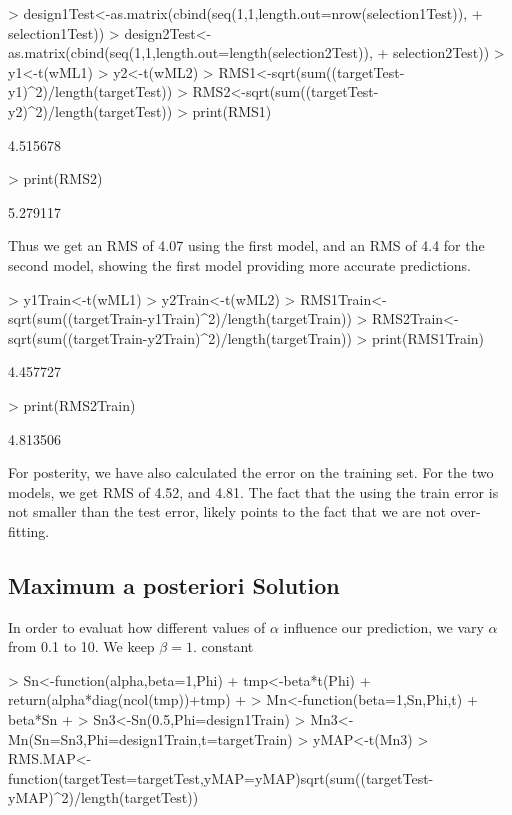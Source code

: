 \documentclass[nogin, 10pt]{article}
\begin{document}
\begin{Schunk}
\begin{Sinput}
> design1Test<-as.matrix(cbind(seq(1,1,length.out=nrow(selection1Test)),
+                          selection1Test))
> design2Test<-as.matrix(cbind(seq(1,1,length.out=length(selection2Test)),
+                          selection2Test))
> y1<-t(wML1)%
> y2<-t(wML2)%
> RMS1<-sqrt(sum((targetTest-y1)^2)/length(targetTest))
> RMS2<-sqrt(sum((targetTest-y2)^2)/length(targetTest))
> print(RMS1)
\end{Sinput}
\begin{Soutput}
[1] 4.515678
\end{Soutput}
\begin{Sinput}
> print(RMS2)
\end{Sinput}
\begin{Soutput}
[1] 5.279117
\end{Soutput}
\end{Schunk}
Thus we get an RMS of 4.07 using the first model, and an RMS of 4.4 for the second model, showing the first model providing more accurate predictions. 

\begin{Schunk}
\begin{Sinput}
> y1Train<-t(wML1)%
> y2Train<-t(wML2)%
> RMS1Train<-sqrt(sum((targetTrain-y1Train)^2)/length(targetTrain))
> RMS2Train<-sqrt(sum((targetTrain-y2Train)^2)/length(targetTrain))
> print(RMS1Train)
\end{Sinput}
\begin{Soutput}
[1] 4.457727
\end{Soutput}
\begin{Sinput}
> print(RMS2Train)
\end{Sinput}
\begin{Soutput}
[1] 4.813506
\end{Soutput}
\end{Schunk}
For posterity, we have also calculated the error on the training set. For the two models, we get RMS of 4.52, and 4.81. The fact that the using the train error is not smaller than the test error, likely points to the fact that we are not over-fitting.

\subsection{Maximum a posteriori Solution}
In order to evaluat how different values of $\alpha$ influence our prediction, we vary $\alpha$ from 0.1 to 10. We keep $\beta=1$. constant
\begin{Schunk}
\begin{Sinput}
> Sn<-function(alpha,beta=1,Phi){
+   tmp<-beta*t(Phi)%
+   return(alpha*diag(ncol(tmp))+tmp) 
+ }
> Mn<-function(beta=1,Sn,Phi,t){
+   beta*Sn%
+ }
> Sn3<-Sn(0.5,Phi=design1Train)
> Mn3<-Mn(Sn=Sn3,Phi=design1Train,t=targetTrain)
> yMAP<-t(Mn3)%
> RMS.MAP<-function(targetTest=targetTest,yMAP=yMAP){sqrt(sum((targetTest-yMAP)^2)/length(targetTest))}
\end{Sinput}
\end{Schunk}
\end{document}
